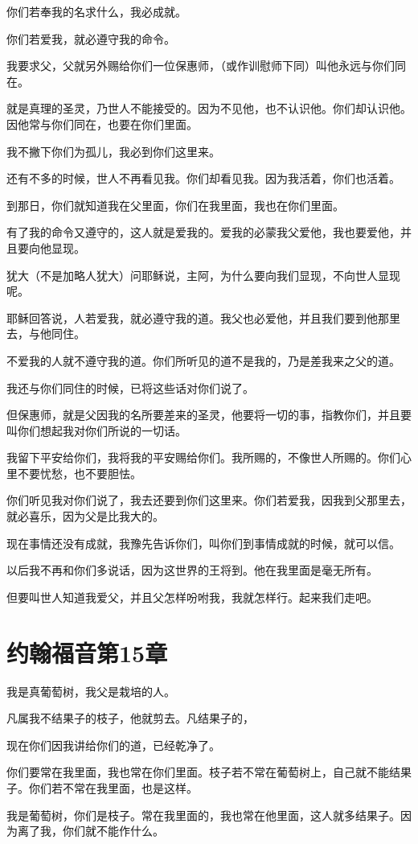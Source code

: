 \documentclass[12pt,oneside]{book}
\begin{document}
你们若奉我的名求什么，我必成就。

你们若爱我，就必遵守我的命令。

我要求父，父就另外赐给你们一位保惠师，（或作训慰师下同）叫他永远与你们同在。

就是真理的圣灵，乃世人不能接受的。因为不见他，也不认识他。你们却认识他。因他常与你们同在，也要在你们里面。

我不撇下你们为孤儿，我必到你们这里来。

还有不多的时候，世人不再看见我。你们却看见我。因为我活着，你们也活着。

到那日，你们就知道我在父里面，你们在我里面，我也在你们里面。

有了我的命令又遵守的，这人就是爱我的。爱我的必蒙我父爱他，我也要爱他，并且要向他显现。

犹大（不是加略人犹大）问耶稣说，主阿，为什么要向我们显现，不向世人显现呢。

耶稣回答说，人若爱我，就必遵守我的道。我父也必爱他，并且我们要到他那里去，与他同住。

不爱我的人就不遵守我的道。你们所听见的道不是我的，乃是差我来之父的道。

我还与你们同住的时候，已将这些话对你们说了。

但保惠师，就是父因我的名所要差来的圣灵，他要将一切的事，指教你们，并且要叫你们想起我对你们所说的一切话。

我留下平安给你们，我将我的平安赐给你们。我所赐的，不像世人所赐的。你们心里不要忧愁，也不要胆怯。

你们听见我对你们说了，我去还要到你们这里来。你们若爱我，因我到父那里去，就必喜乐，因为父是比我大的。

现在事情还没有成就，我豫先告诉你们，叫你们到事情成就的时候，就可以信。

以后我不再和你们多说话，因为这世界的王将到。他在我里面是毫无所有。

但要叫世人知道我爱父，并且父怎样吩咐我，我就怎样行。起来我们走吧。

\chapter{约翰福音第15章}
我是真葡萄树，我父是栽培的人。

凡属我不结果子的枝子，他就剪去。凡结果子的，

现在你们因我讲给你们的道，已经乾净了。

你们要常在我里面，我也常在你们里面。枝子若不常在葡萄树上，自己就不能结果子。你们若不常在我里面，也是这样。

我是葡萄树，你们是枝子。常在我里面的，我也常在他里面，这人就多结果子。因为离了我，你们就不能作什么。
\end{document}
